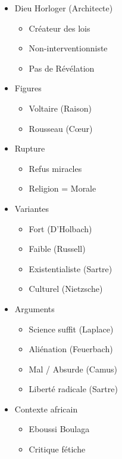 \documentclass[11pt]{article}
\begin{document}
\begin{popfigure}
\begin{tcbraster}[raster columns=2,raster equal height=rows,raster column skip=6pt,raster row skip=6pt,enhanced,blankest]
\begin{tcolorbox}
\begin{itemize}[nosep,leftmargin=*,itemsep=1pt,font=\scriptsize]
\item Dieu Horloger (Architecte)
\begin{itemize}[nosep,leftmargin=1.1em,itemsep=0pt]
\item Créateur des lois
\item Non-interventionniste
\item Pas de Révélation
\end{itemize}
\item Figures
\begin{itemize}[nosep,leftmargin=1.1em,itemsep=0pt]
\item Voltaire (Raison)
\item Rousseau (Cœur)
\end{itemize}
\item Rupture
\begin{itemize}[nosep,leftmargin=1.1em,itemsep=0pt]
\item Refus miracles
\item Religion = Morale
\end{itemize}
\end{itemize}
\end{tcolorbox}
\begin{tcolorbox}[enhanced,colback=white,colframe=poppurple,boxrule=0.9pt,arc=3pt,title={Athéisme},fonttitle=\bfseries\scriptsize,coltitle=white,colbacktitle=poppurple,left=4pt,right=4pt,top=2pt,bottom=2pt,boxsep=1pt,toptitle=1.5pt,bottomtitle=1.5pt,halign=left]
\begin{itemize}[nosep,leftmargin=*,itemsep=1pt,font=\scriptsize]
\item Variantes
\begin{itemize}[nosep,leftmargin=1.1em,itemsep=0pt]
\item Fort (D'Holbach)
\item Faible (Russell)
\item Existentialiste (Sartre)
\item Culturel (Nietzsche)
\end{itemize}
\item Arguments
\begin{itemize}[nosep,leftmargin=1.1em,itemsep=0pt]
\item Science suffit (Laplace)
\item Aliénation (Feuerbach)
\item Mal / Absurde (Camus)
\item Liberté radicale (Sartre)
\end{itemize}
\item Contexte africain
\begin{itemize}[nosep,leftmargin=1.1em,itemsep=0pt]
\item Eboussi Boulaga
\item Critique fétiche
\end{itemize}
\end{itemize}
\end{tcolorbox}
\end{tcbraster}


\end{popfigure}
\end{document}
